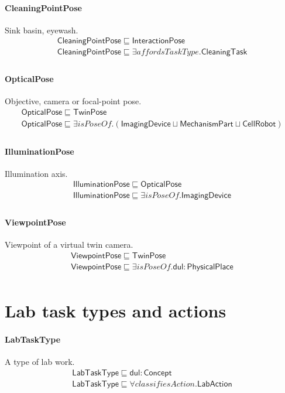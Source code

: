 \documentclass[10pt]{article}
\begin{document}
\paragraph{CleaningPointPose} Sink basin, eyewash.
\[\begin{array}{l}
\mathsf{CleaningPointPose} \sqsubseteq  \mathsf{InteractionPose} \\
\mathsf{CleaningPointPose} \sqsubseteq  \exists \mathit{affordsTaskType}.\mathsf{CleaningTask} \\
\end{array}\]
\paragraph{OpticalPose} Objective, camera or focal-point pose.
\[\begin{array}{l}
\mathsf{OpticalPose} \sqsubseteq  \mathsf{TwinPose} \\
\mathsf{OpticalPose} \sqsubseteq  \exists \mathit{isPoseOf}.(\mathsf{ImagingDevice} \sqcup  \mathsf{MechanismPart} \sqcup  \mathsf{CellRobot}) \\
\end{array}\]
\paragraph{IlluminationPose} Illumination axis.
\[\begin{array}{l}
\mathsf{IlluminationPose} \sqsubseteq  \mathsf{OpticalPose} \\
\mathsf{IlluminationPose} \sqsubseteq  \exists \mathit{isPoseOf}.\mathsf{ImagingDevice} \\
\end{array}\]
\paragraph{ViewpointPose} Viewpoint of a virtual twin camera.
\[\begin{array}{l}
\mathsf{ViewpointPose} \sqsubseteq  \mathsf{TwinPose} \\
\mathsf{ViewpointPose} \sqsubseteq  \exists \mathit{isPoseOf}.\mathsf{dul{:}PhysicalPlace} \\
\end{array}\]
\section*{Lab task types and actions}
\paragraph{LabTaskType} A type of lab work.
\[\begin{array}{l}
\mathsf{LabTaskType} \sqsubseteq  \mathsf{dul{:}Concept} \\
\mathsf{LabTaskType} \sqsubseteq  \forall \mathit{classifiesAction}.\mathsf{LabAction} \\
\end{array}\]
\end{document}
